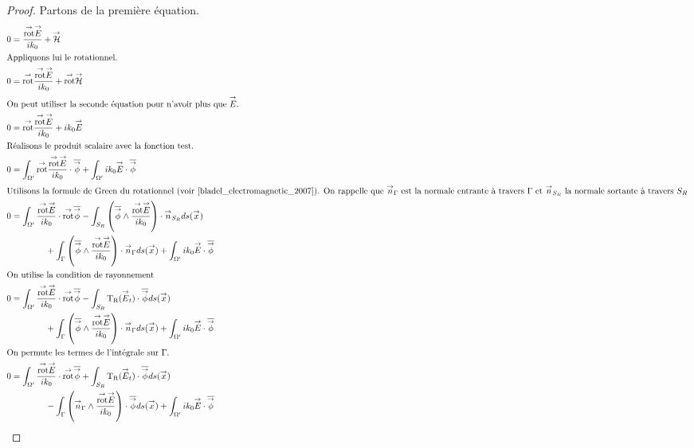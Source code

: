   \begin{proof}
    Partons de la première équation.
    \begin{align}
          0 & = \frac{\trot \vE}{ik_0} + \vH
          \\ \intertext{Appliquons lui le rotationnel.}
          0 & = \trot \frac{\trot \vE}{ik_0} + \trot \vH
          \\ \intertext{On peut utiliser la seconde équation pour n'avoir plus que \(\vE\).}
          0 & = \trot \frac{\trot \vE}{ik_0} + ik_0 \vE
          \\ \intertext{Réalisons le produit scalaire avec la fonction test.}
          0 & = \int_{\OO'}{ \trot \frac{\trot \vE}{ik_0}\cdot \conj{\vect{\phi}}} +  \int_{\OO'} ik_0 \vE \cdot \conj{\vect{\phi}}
          \\ \intertext{Utilisons la formule de Green du rotationnel (voir \cite[eq.~(A1.32)]{bladel_electromagnetic_2007}). On rappelle que \(\vn_\Gamma\) est la normale entrante à travers \(\Gamma\) et \(\vn_{S_R}\) la normale sortante à travers \(S_R\) }
          0 & = \int_{\OO'}{ \frac{\trot \vE}{ik_0}\cdot \trot \conj{\vect{\phi}}} - \int_{S_R} \left( \conj{\vect \phi} \pvect \frac{\trot \vE}{ik_0}\right)  \cdot \vn_{S_R} ds(\vx) 
          \\ \notag
          & \qquad \qquad + \int_\Gamma \left( \conj{\vect \phi} \pvect \frac{\trot \vE}{ik_0}\right)  \cdot \vn_\Gamma ds(\vx) +\int_{\OO'} ik_0 \vE \cdot \conj{\vect{\phi}}
          \\ \intertext{On utilise la condition de rayonnement}
          0 & = \int_{\OO'}{ \frac{\trot \vE}{ik_0}\cdot \trot \conj{\vect{\phi}}} - \int_{S_R} \Tr(\vE_t)  \cdot \conj{\vect{\phi}} ds(\vx) 
          \\ \notag
          & \qquad \qquad + \int_\Gamma \left( \conj{\vect \phi} \pvect \frac{\trot \vE}{ik_0}\right)  \cdot \vn_\Gamma ds(\vx) + \int_{\OO'} ik_0 \vE \cdot \conj{\vect{\phi}}
          \\ \intertext{On permute les termes de l'intégrale sur \(\Gamma\).}
          0 & =\int_{\OO'} \frac{\trot \vE}{ik_0}\cdot \trot \conj{\vect{\phi}} + \int_{S_R} \Tr(\vE_t)  \cdot \conj{\vect{\phi}} ds(\vx) 
          \\ \notag
          & \qquad \qquad - \int_\Gamma \left(\vn_\Gamma \pvect \frac{\trot \vE}{ik_0}\right) \cdot \conj{\vect \phi} ds(\vx) +  \int_{\OO'} ik_0 \vE \cdot \conj{\vect{\phi}}
      \end{align}
  \end{proof}

